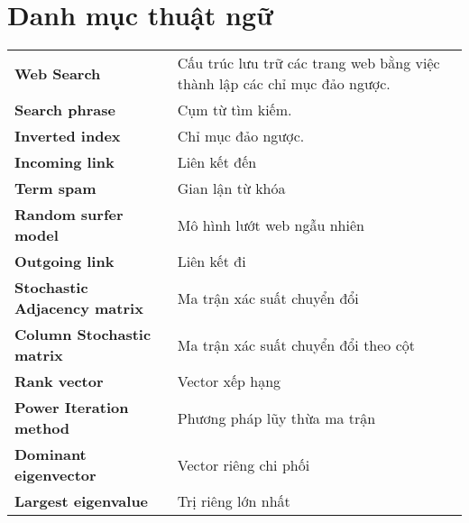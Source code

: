 \chapter*{Danh mục thuật ngữ}
\begin{center}
\renewcommand{\arraystretch}{1.5}
\begin{tabular}{lp{}}
    \textbf{Web Search} & Cấu trúc lưu trữ các trang web bằng việc thành lập các chỉ mục đảo ngược.\\
    \textbf{Search phrase} & Cụm từ tìm kiếm.\\
    \textbf{Inverted index} & Chỉ mục đảo ngược.\\
    \textbf{Incoming link} & Liên kết đến\\
    \textbf{Term spam} & Gian lận từ khóa\\
    \textbf{Random surfer model} & Mô hình lướt web ngẫu nhiên\\
    \textbf{Outgoing link} & Liên kết đi\\
    \textbf{Stochastic Adjacency matrix} & Ma trận xác suất chuyển đổi\\
    \textbf{Column Stochastic matrix} & Ma trận xác suất chuyển đổi theo cột\\
    \textbf{Rank vector} & Vector xếp hạng\\
    \textbf{Power Iteration method} & Phương pháp lũy thừa ma trận \\
    \textbf{Dominant eigenvector} & Vector riêng chi phối \\
    \textbf{Largest eigenvalue} & Trị riêng lớn nhất
\end{tabular}
\end{center}


